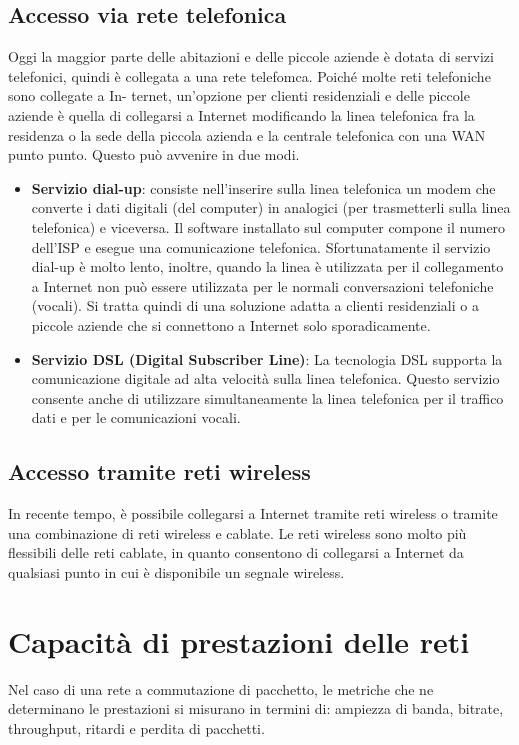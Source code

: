 \documentclass[12pt]{report}
\begin{document}
	\subsection{Accesso via rete telefonica}
	Oggi la maggior parte delle abitazioni e delle piccole aziende è dotata di servizi telefonici, quindi è collegata a una rete telefomca. Poiché molte reti telefoniche sono collegate a In- ternet, un'opzione per clienti residenziali e delle piccole aziende è quella di collegarsi a Internet modificando la linea telefonica fra la residenza o la sede della piccola azienda e la centrale telefonica con una WAN punto punto. Questo può avvenire in due modi.
	\begin{itemize}
		\item \textbf{Servizio dial-up}: consiste nell'inserire sulla linea telefonica un modem che converte i dati digitali (del computer) in analogici (per trasmetterli sulla linea telefonica) e viceversa. Il software installato sul computer compone il numero dell'ISP e esegue una comunicazione telefonica. Sfortunatamente il servizio dial-up è molto lento, inoltre, quando la linea è utilizzata per il collegamento a Internet non può essere utilizzata per le normali conversazioni telefoniche (vocali). Si tratta quindi di una soluzione adatta a clienti residenziali o a piccole aziende che si connettono a Internet solo sporadicamente.
		\item \textbf{Servizio DSL (Digital Subscriber Line)}: La tecnologia DSL supporta la comunicazione digitale ad alta velocità sulla linea telefonica. Questo servizio consente anche di utilizzare simultaneamente la linea telefonica per il traffico dati e per le comunicazioni vocali.
	\end{itemize}

	\subsection{Accesso tramite reti wireless}
	In recente tempo, è possibile collegarsi a Internet tramite reti wireless o tramite una combinazione di reti wireless e cablate. Le reti wireless sono molto più flessibili delle reti cablate, in quanto consentono di collegarsi a Internet da qualsiasi punto in cui è disponibile un segnale wireless.

	\section{Capacità di prestazioni delle reti}
	Nel caso di una rete a commutazione di pacchetto, le metriche che ne determinano le prestazioni si misurano in termini di: ampiezza di banda, bitrate, throughput, ritardi e perdita di pacchetti.
\end{document}
